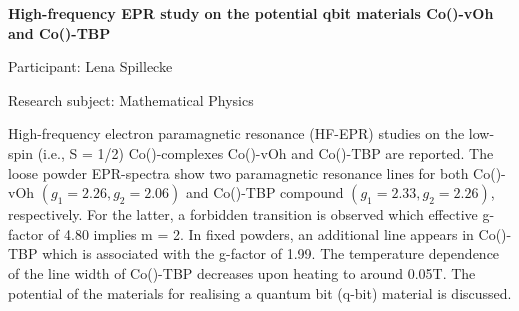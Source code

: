\hfill 

\begin{minipage}[t]{1.0\textwidth}

\begin{center}

{{\large\bfseries High-frequency EPR study on the potential qbit materials Co()-vOh and Co()-TBP}\par}

\end{center}

{\noindent Participant: Lena Spillecke\par} 

{\noindent Research subject: Mathematical Physics\par}\medskip

\noindent High-frequency electron paramagnetic resonance (HF-EPR) studies on the low-spin (i.e., S = 1/2) Co()-complexes Co()-vOh and Co()-TBP are reported. The loose powder EPR-spectra show two paramagnetic resonance lines for both Co()-vOh $(g_{1} = 2.26, g_{2} = 2.06)$ and Co()-TBP compound $(g_{1} = 2.33, g_{2} = 2.26)$, respectively. For the latter, a forbidden transition is observed which effective g-factor of  4.80 implies \Delta m = 2. In fixed powders, an additional line appears in Co()-TBP which is associated with the g-factor of 1.99. The temperature dependence of the line width of Co()-TBP decreases upon heating to around 0.05T. The potential of the materials for realising a quantum bit (q-bit) material is discussed. \par\end{minipage}

\hfill 

